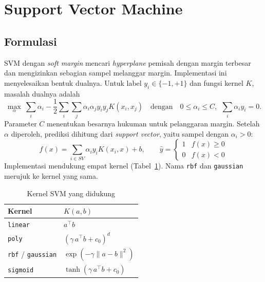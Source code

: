 \section{Support Vector Machine}
\label{sec:svm}

\subsection{Formulasi}

SVM dengan \textit{soft margin} mencari \textit{hyperplane} pemisah dengan margin
terbesar dan mengizinkan sebagian sampel melanggar margin.
Implementasi ini menyelesaikan bentuk dualnya. Untuk label $y_i\in\{-1,+1\}$ dan
fungsi kernel $K$, masalah dualnya adalah
\begin{equation}
	\max_{\alpha}\ \sum_{i}\alpha_i-\frac{1}{2}\sum_{i}\sum_{j}\alpha_i\alpha_j y_i y_j K(x_i,x_j)
	\quad\text{dengan}\quad 0\le\alpha_i\le C,\ \ \sum_i\alpha_i y_i=0 .
\end{equation}
Parameter $C$ menentukan besarnya hukuman untuk pelanggaran margin. Setelah
$\alpha$ diperoleh, prediksi dihitung dari \textit{support vector}, yaitu sampel
dengan $\alpha_i>0$:
\begin{equation}
	f(x)=\sum_{i\in SV}\alpha_i y_i K(x_i,x)+b,\qquad \hat{y}=\begin{cases}1 & f(x)\ge 0\\ 0 & f(x)<0\end{cases}
\end{equation}
Implementasi mendukung empat kernel (Tabel~\ref{tab:kernel}). Nama \texttt{rbf}
dan \texttt{gaussian} merujuk ke kernel yang sama.

\begin{table}[H]
	\centering
	\caption{Kernel SVM yang didukung}
	\label{tab:kernel}
	\begin{tabular}{l l}
		\toprule
		\textbf{Kernel} & $K(a,b)$ \\
		\midrule
		\texttt{linear} & $a^\top b$ \\
		\texttt{poly} & $(\gamma\, a^\top b + c_0)^{d}$ \\
		\texttt{rbf} / \texttt{gaussian} & $\exp(-\gamma\lVert a-b\rVert^2)$ \\
		\texttt{sigmoid} & $\tanh(\gamma\, a^\top b + c_0)$ \\
		\bottomrule
	\end{tabular}
\end{table}



